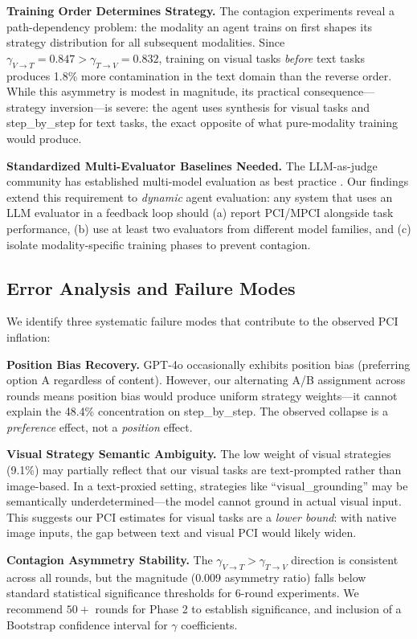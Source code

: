 \documentclass[11pt,a4paper]{article}
\begin{document}
\textbf{Training Order Determines Strategy.} The contagion experiments reveal a path-dependency problem: the modality an agent trains on first shapes its strategy distribution for all subsequent modalities. Since $\gamma_{V\to T} = 0.847 > \gamma_{T\to V} = 0.832$, training on visual tasks \textit{before} text tasks produces 1.8\% more contamination in the text domain than the reverse order. While this asymmetry is modest in magnitude, its practical consequence---strategy inversion---is severe: the agent uses synthesis for visual tasks and step\_by\_step for text tasks, the exact opposite of what pure-modality training would produce.

\textbf{Standardized Multi-Evaluator Baselines Needed.} The LLM-as-judge community has established multi-model evaluation as best practice \cite{zheng2023judging}. Our findings extend this requirement to \textit{dynamic} agent evaluation: any system that uses an LLM evaluator in a feedback loop should (a) report PCI/MPCI alongside task performance, (b) use at least two evaluators from different model families, and (c) isolate modality-specific training phases to prevent contagion.

\subsection{Error Analysis and Failure Modes}

We identify three systematic failure modes that contribute to the observed PCI inflation:

\textbf{Position Bias Recovery.} GPT-4o occasionally exhibits position bias (preferring option A regardless of content). However, our alternating A/B assignment across rounds means position bias would produce uniform strategy weights---it cannot explain the 48.4\% concentration on step\_by\_step. The observed collapse is a \textit{preference} effect, not a \textit{position} effect.

\textbf{Visual Strategy Semantic Ambiguity.} The low weight of visual strategies (9.1\%) may partially reflect that our visual tasks are text-prompted rather than image-based. In a text-proxied setting, strategies like ``visual\_grounding'' may be semantically underdetermined---the model cannot ground in actual visual input. This suggests our PCI estimates for visual tasks are a \textit{lower bound}: with native image inputs, the gap between text and visual PCI would likely widen.

\textbf{Contagion Asymmetry Stability.} The $\gamma_{V\to T} > \gamma_{T\to V}$ direction is consistent across all rounds, but the magnitude (0.009 asymmetry ratio) falls below standard statistical significance thresholds for 6-round experiments. We recommend $50+$ rounds for Phase 2 to establish significance, and inclusion of a Bootstrap confidence interval for $\gamma$ coefficients.
\end{document}

